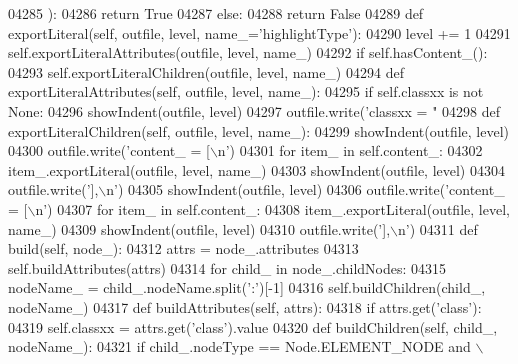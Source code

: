 \begin{DoxyCode}
{{{{{{{{{{{{{{{{{{{{{{{{{{{{{{{{{{{{{{{{{{{{{{{{{{{{{{{{{{{{{{{{{{{{{{{{{{{{{{{{{{{{{{{{{{{{{{{{{{{{{{{{{{{{{{{{{{{{{{{{{{{{{{{{{{{{{{{{{{{{{{{{{{{{{{{{{{{{{{{{{{{{{{{{{{{{{{{{{{{{{{{{{{{{{{{{{{{{{{{{{{{{{{{{{{{{{{{{{{{{{{{{{{{{{{{{{{{{{{{{{{{{{{{{{{{{{{{{{{{{{{{{{{{{{{{{{{{{{{{{{04285             ):
04286             \textcolor{keywordflow}{return} \textcolor{keyword}{True}
04287         \textcolor{keywordflow}{else}:
04288             \textcolor{keywordflow}{return} \textcolor{keyword}{False}
04289     \textcolor{keyword}{def }exportLiteral(self, outfile, level, name\_='highlightType'):
04290         level += 1
04291         self.exportLiteralAttributes(outfile, level, name\_)
04292         \textcolor{keywordflow}{if} self.hasContent_():
04293             self.exportLiteralChildren(outfile, level, name\_)
04294     \textcolor{keyword}{def }exportLiteralAttributes(self, outfile, level, name\_):
04295         \textcolor{keywordflow}{if} self.classxx \textcolor{keywordflow}{is} \textcolor{keywordflow}{not} \textcolor{keywordtype}{None}:
04296             showIndent(outfile, level)
04297             outfile.write(\textcolor{stringliteral}{'classxx = "%
04298     \textcolor{keyword}{def }exportLiteralChildren(self, outfile, level, name\_):
04299         showIndent(outfile, level)
04300         outfile.write(\textcolor{stringliteral}{'content\_ = [\(\backslash\)n'})
04301         \textcolor{keywordflow}{for} item\_ \textcolor{keywordflow}{in} self.content_:
04302             item\_.exportLiteral(outfile, level, name\_)
04303         showIndent(outfile, level)
04304         outfile.write(\textcolor{stringliteral}{'],\(\backslash\)n'})
04305         showIndent(outfile, level)
04306         outfile.write(\textcolor{stringliteral}{'content\_ = [\(\backslash\)n'})
04307         \textcolor{keywordflow}{for} item\_ \textcolor{keywordflow}{in} self.content_:
04308             item\_.exportLiteral(outfile, level, name\_)
04309         showIndent(outfile, level)
04310         outfile.write(\textcolor{stringliteral}{'],\(\backslash\)n'})
04311     \textcolor{keyword}{def }build(self, node\_):
04312         attrs = node\_.attributes
04313         self.buildAttributes(attrs)
04314         \textcolor{keywordflow}{for} child\_ \textcolor{keywordflow}{in} node\_.childNodes:
04315             nodeName\_ = child\_.nodeName.split(\textcolor{stringliteral}{':'})[-1]
04316             self.buildChildren(child\_, nodeName\_)
04317     \textcolor{keyword}{def }buildAttributes(self, attrs):
04318         \textcolor{keywordflow}{if} attrs.get(\textcolor{stringliteral}{'class'}):
04319             self.classxx = attrs.get(\textcolor{stringliteral}{'class'}).value
04320     \textcolor{keyword}{def }buildChildren(self, child\_, nodeName\_):
04321         \textcolor{keywordflow}{if} child\_.nodeType == Node.ELEMENT\_NODE \textcolor{keywordflow}{and} \(\backslash\)
}}}}}}}}}}}}}}}}}}}}}}}}}}}}}}}}}}}}}}}}}}}}}}}}}}}}}}}}}}}}}}}}}}}}}}}}}}}}}}}}}}}}}}}}}}}}}}}}}}}}}}}}}}}}}}}}}}}}}}}}}}}}}}}}}}}}}}}}}}}}}}}}}}}}}}}}}}}}}}}}}}}}}}}}}}}}}}}}}}}}}}}}}}}}}}}}}}}}}}}}}}}}}}}}}}}}}}}}}}}}}}}}}}}}}}}}}}}}}}}}}}}}}}}}}}}}}}}}}}}}}}}}}}}}}}}}}}}}}}}}}}
\end{DoxyCode}
